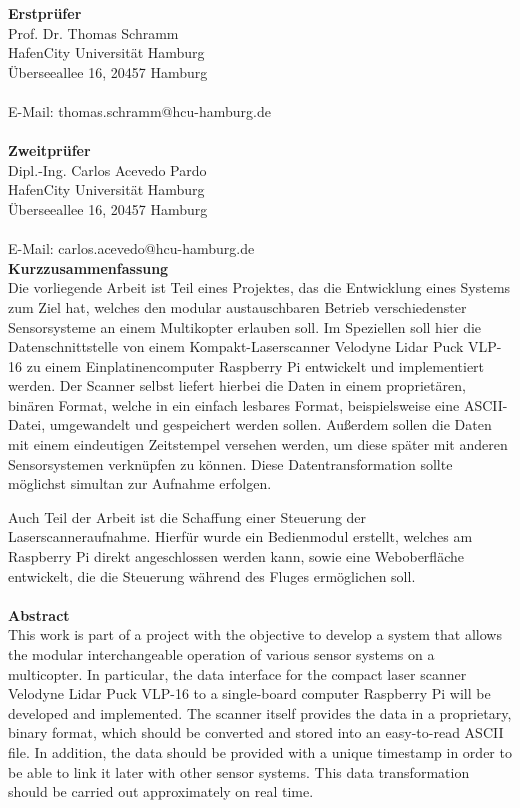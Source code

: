 \documentclass[a4paper,12pt,bibliography=totoc, listof=totoc,titlepage,pointlessnumbers]{scrreprt}
\begin{document}
\noindent\textbf{\large Erstprüfer}\\
Prof. Dr. Thomas Schramm\\
HafenCity Universität Hamburg\\
Überseeallee 16, 20457 Hamburg\\
\\
E-Mail: thomas.schramm@hcu-hamburg.de\\
\vspace{3cm}\\
\textbf{\large Zweitprüfer}\\
Dipl.-Ing. Carlos Acevedo Pardo\\
HafenCity Universität Hamburg\\
Überseeallee 16, 20457 Hamburg\\
\\
E-Mail: carlos.acevedo@hcu-hamburg.de\\
\newpage
\noindent\textbf{\large Kurzzusammenfassung}\\
Die vorliegende Arbeit ist Teil eines Projektes, das die Entwicklung eines Systems zum Ziel hat, welches den modular austauschbaren Betrieb verschiedenster Sensorsysteme an einem Multikopter erlauben soll. Im Speziellen soll hier die Datenschnittstelle von einem Kompakt-Laser\-scan\-ner Velodyne Lidar Puck VLP-16 zu einem Einplatinencomputer Rasp\-berry Pi entwickelt und implementiert werden. Der Scanner selbst liefert hierbei die Daten in einem proprietären, binären Format, welche in ein einfach lesbares Format, beispielsweise eine ASCII-Datei, umgewandelt und gespeichert werden sollen. Außerdem sollen die Daten mit einem eindeutigen Zeitstempel versehen werden, um diese später mit anderen Sensorsystemen verknüpfen zu können. Diese Datentransformation sollte möglichst simultan zur Aufnahme erfolgen.

Auch Teil der Arbeit ist die Schaffung einer Steuerung der Laser\-scan\-ner\-auf\-nahme. Hierfür wurde ein Bedienmodul erstellt, welches am Rasp\-berry Pi direkt angeschlossen werden kann, sowie eine Weboberfläche entwickelt, die die Steuerung während des Fluges ermöglichen soll.\\
\vspace{2cm}\\
\noindent\textbf{\large Abstract}\\
This work is part of a project with the objective to develop a system that allows the modular interchangeable operation of various sensor systems on a multicopter. In particular, the data interface for the compact laser scanner Velodyne Lidar Puck VLP-16 to a single-board computer Rasp\-berry Pi will be developed and implemented. The scanner itself provides the data in a proprietary, binary format, which should be converted and stored into an easy-to-read ASCII file. In addition, the data should be provided with a unique timestamp in order to be able to link it later with other sensor systems. This data transformation should be carried out approximately on real time.
\end{document}

